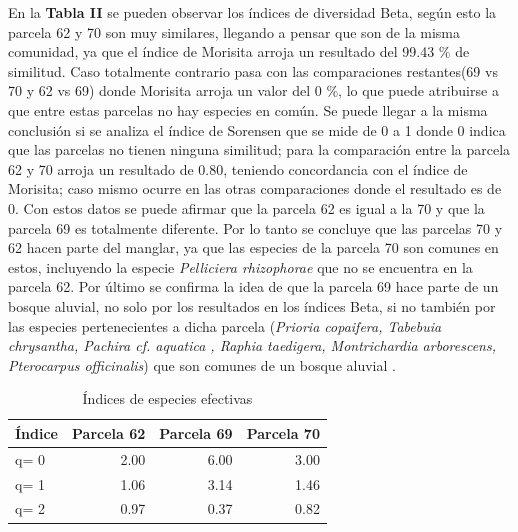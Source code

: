 \documentclass[conference,final,12pt,]{IEEEtran}
\begin{document}
En la \textbf{Tabla II} se pueden observar los índices de diversidad
Beta, según esto la parcela 62 y 70 son muy similares, llegando a pensar
que son de la misma comunidad, ya que el índice de Morisita arroja un
resultado del 99.43 \(\%\) de similitud. Caso totalmente contrario pasa con
las comparaciones restantes(69 vs 70 y 62 vs 69) donde Morisita arroja
un valor del 0 \(\%\), lo que puede atribuirse a que entre
estas parcelas no hay especies en común. Se puede llegar a la misma
conclusión si se analiza el índice de Sorensen que se mide de 0 a 1
donde 0 indica que las parcelas no tienen ninguna similitud; para la
comparación entre la parcela 62 y 70 arroja un resultado de 0.80,
teniendo concordancia con el índice de Morisita; caso mismo ocurre en
las otras comparaciones donde el resultado es de 0. Con estos datos se
puede afirmar que la parcela 62 es igual a la 70 y que la parcela 69 es
totalmente diferente. Por lo tanto se concluye que las parcelas
70 y 62 hacen parte del manglar, ya que las
especies de la parcela 70 son comunes en estos,
incluyendo la especie \emph{Pelliciera rhizophorae} \citep{Y} que no se
encuentra en la parcela 62. Por último se confirma la idea de que la parcela
69 hace parte de un bosque aluvial, no solo por los resultados en los índices Beta,
si no también por las especies pertenecientes a dicha parcela 
(\emph{Prioria copaifera,  Tabebuia chrysantha, Pachira cf. aquatica  ,   
Raphia taedigera,  Montrichardia arborescens,  Pterocarpus officinalis})
que son comunes de un bosque aluvial \citep{Y}.

\begin{table}[htb]

\caption{\label{tab:unnamed-chunk-4}Índices de especies efectivas}
\centering
\begin{tabular}[t]{l|r|r|r}
\hline
Índice & Parcela 62 & Parcela 69 & Parcela 70\\
\hline
q= 0 & 2.00 & 6.00 & 3.00\\
\hline
q= 1 & 1.06 & 3.14 & 1.46\\
\hline
q= 2 & 0.97 & 0.37 & 0.82\\
\hline
\end{tabular}
\end{table}
\end{document}
